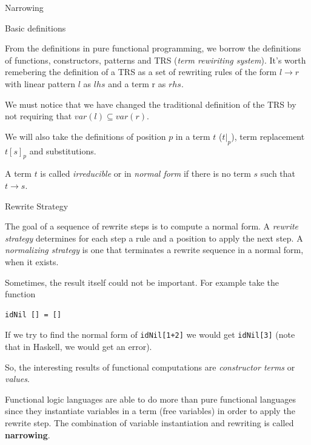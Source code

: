 \documentclass{beamer}
\begin{document}
\begin{section}{Narrowing}
  \begin{subsection}{Basic definitions}
\begin{frame}
  From the definitions in pure functional programming, we borrow the definitions of functions, constructors, patterns and TRS (\textit{term rewiriting system}). It's worth remebering the definition of a TRS as a set of rewriting rules of the form $l \rightarrow r$ with linear pattern $l$ as $lhs$ and a term r as $rhs$.

  We must notice that we have changed the traditional definition of the TRS by not requiring that $var(l) \subseteq var(r)$.
\end{frame}

\begin{frame}
  We will also take the definitions of position $p$ in a term $t$ ($t|_p$), term replacement $t[s]_p$ and substitutions.

  A term $t$ is called \textit{irreducible} or in \textit{normal form} if there is no term $s$ such that $t \rightarrow s$.
\end{frame}
\end{subsection}

\begin{subsection}{Rewrite Strategy}

  \begin{frame}
  The goal of a sequence of rewrite steps is to compute a normal form. A \textit{rewrite strategy} determines for each step a rule and a position to apply the next step. A \textit{normalizing strategy} is one that terminates a rewrite sequence in a normal form, when it exists.
\end{frame}

\begin{frame}[fragile]
Sometimes, the result itself could not be important. For example take the function

\begin{verbatim}
idNil [] = []
\end{verbatim}

If we try to find the normal form of \verb|idNil[1+2]| we would get \verb|idNil[3]| (note that in Haskell, we would get an error).

So, the interesting results of functional computations are \textit{constructor terms} or \textit{values}.
\end{frame}

\begin{frame}
Functional logic languages are able to do more than pure functional languages since they instantiate variables in a term (free variables) in order to apply the rewrite step. The combination of variable instantiation and rewriting is called \textbf{narrowing}.
\end{frame}


\end{subsection}
\end{section}
\end{document}

